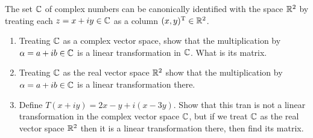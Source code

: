 \documentclass{article}
\begin{document}
\begin{exercise}
  The set $\C$ of complex numbers can be canonically identified 
  with the space $\R^2$ by treating each $z=x+iy\in\C$ as a column
  $(x,y)\tran\in\R^2$.
  \begin{enumerate}
    \item Treating $\C$ as a complex vector space, show that the multiplication
      by $\alpha=a+ib\in\C$ is a linear transformation in $\C$.
      What is its matrix.
    \item Treating $\C$ as the real vector space $\R^2$ show that the multiplication 
      by $\alpha=a+ib\in\C$ is a linear transformation there.
    \item Define $T(x+iy)=2x-y+i(x-3y)$. Show that this tran is not a 
      linear transformation in the complex vector space $\C$, but
      if we treat $\C$ as the real vector space $\R^2$ then it is a linear
      transformation there, then find its matrix.
  \end{enumerate}
\end{exercise}
\end{document}
